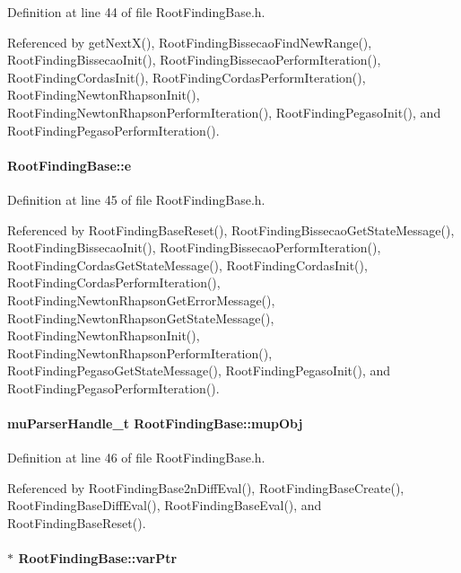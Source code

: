 Definition at line 44 of file RootFindingBase.h.

Referenced by getNextX(), RootFindingBissecaoFindNewRange(), RootFindingBissecaoInit(), RootFindingBissecaoPerformIteration(), RootFindingCordasInit(), RootFindingCordasPerformIteration(), RootFindingNewtonRhapsonInit(), RootFindingNewtonRhapsonPerformIteration(), RootFindingPegasoInit(), and RootFindingPegasoPerformIteration().\hypertarget{structRootFindingBase_5a4a111c9250303d6eb8dc8d29f7c00f}{
\paragraph[e]{ {\bf RootFindingBase::e}}\hfill}
\label{structRootFindingBase_5a4a111c9250303d6eb8dc8d29f7c00f}




Definition at line 45 of file RootFindingBase.h.

Referenced by RootFindingBaseReset(), RootFindingBissecaoGetStateMessage(), RootFindingBissecaoInit(), RootFindingBissecaoPerformIteration(), RootFindingCordasGetStateMessage(), RootFindingCordasInit(), RootFindingCordasPerformIteration(), RootFindingNewtonRhapsonGetErrorMessage(), RootFindingNewtonRhapsonGetStateMessage(), RootFindingNewtonRhapsonInit(), RootFindingNewtonRhapsonPerformIteration(), RootFindingPegasoGetStateMessage(), RootFindingPegasoInit(), and RootFindingPegasoPerformIteration().\hypertarget{structRootFindingBase_e77677949a256721d17168efa25e3849}{
\paragraph[mupObj]{\setlength{\rightskip}{0pt plus 5cm}muParserHandle\_\-t {\bf RootFindingBase::mupObj}}\hfill}
\label{structRootFindingBase_e77677949a256721d17168efa25e3849}




Definition at line 46 of file RootFindingBase.h.

Referenced by RootFindingBase2nDiffEval(), RootFindingBaseCreate(), RootFindingBaseDiffEval(), RootFindingBaseEval(), and RootFindingBaseReset().\hypertarget{structRootFindingBase_148f62857539ad7baada5c292782aabf}{
\paragraph[varPtr]{$\ast$ {\bf RootFindingBase::varPtr}}\hfill}
\label{structRootFindingBase_148f62857539ad7baada5c292782aabf}




